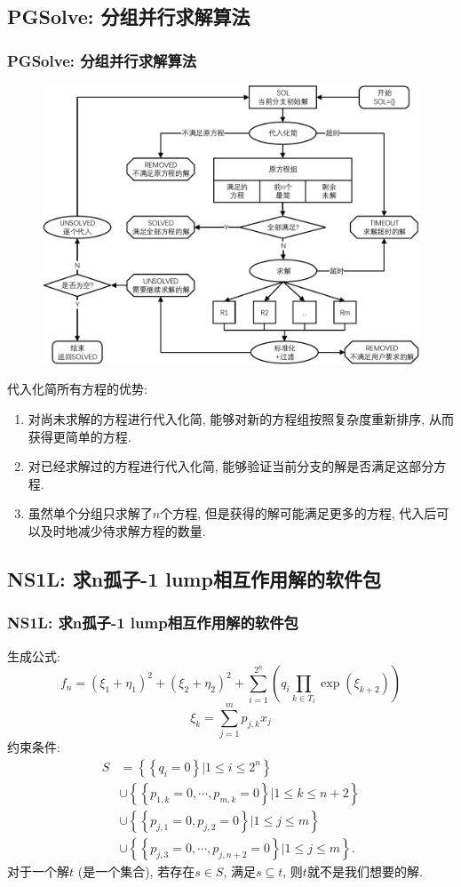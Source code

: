 \documentclass{beamer}
\newcommand{\sbrace}[1]{\left(#1\right)}
\newcommand{\bbrace}[1]{\left\{#1\right\}}
\begin{document}
\subsection{PGSolve: 分组并行求解算法}
\begin{frame}
\frametitle{PGSolve: 分组并行求解算法}
\begin{figure}
\centering
\includegraphics[height=0.8\textheight]{../paper/fig/pgsolve.pdf}
\end{figure}
\end{frame}

\begin{frame}
代入化简所有方程的优势:
\begin{enumerate}
\item 对尚未求解的方程进行代入化简, 能够对新的方程组按照复杂度重新排序, 从而获得更简单的方程.
\item 对已经求解过的方程进行代入化简, 能够验证当前分支的解是否满足这部分方程. 
\item 虽然单个分组只求解了$n$个方程, 但是获得的解可能满足更多的方程, 代入后可以及时地减少待求解方程的数量. 
\end{enumerate}
\end{frame}

\subsection{NS1L: 求n孤子-1 lump相互作用解的软件包}
\begin{frame}
\frametitle{NS1L: 求n孤子-1 lump相互作用解的软件包}
生成公式:
\[
    f_n=\sbrace{\xi_1+\eta_1}^2+\sbrace{\xi_2+\eta_2}^2+\sum_{i=1}^{2^n}\sbrace {q_i\prod_{k \in T_i}{\exp(\xi_{k+2})}}
\]
\[
    \xi_k=\sum_{j=1}^m{p_{j,k}x_j}
\]
约束条件:
\[
\begin{split}
    S&=\bbrace{\bbrace{q_i=0}|1\le i \le 2^n} \\ 
        &\cup \bbrace{\bbrace{p_{1,k}=0,\cdots,p_{m,k}=0}|1\le k \le n+2}  \\
        &\cup \bbrace{\bbrace{p_{j,1}=0,p_{j,2}=0}|1\le j \le m} \\ 
        &\cup \bbrace{\bbrace{p_{j,3}=0,\cdots,p_{j,n+2}=0}|1\le j \le m} . 
\end{split}
\]
对于一个解$t$ (是一个集合), 若存在$s\in S$, 满足$s\subseteq t$, 则$t$就不是我们想要的解.
\end{frame}
\end{document}

